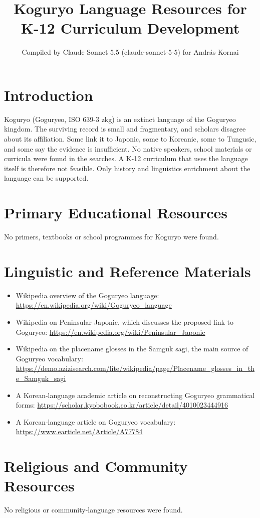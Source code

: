 \documentclass[12pt]{article}
\title{Koguryo Language Resources for K-12 Curriculum Development}
\author{Compiled by Claude Sonnet 5.5 (claude-sonnet-5-5) for Andr\'as Kornai}
\date{}
\begin{document}
\maketitle

\section{Introduction}
Koguryo (Goguryeo, ISO 639-3 zkg) is an extinct language of the Goguryeo kingdom. The surviving record is small and fragmentary, and scholars disagree about its affiliation. Some link it to Japonic, some to Koreanic, some to Tungusic, and some say the evidence is insufficient. No native speakers, school materials or curricula were found in the searches. A K-12 curriculum that uses the language itself is therefore not feasible. Only history and linguistics enrichment about the language can be supported.

\section{Primary Educational Resources}
No primers, textbooks or school programmes for Koguryo were found.

\section{Linguistic and Reference Materials}
\begin{itemize}
\item Wikipedia overview of the Goguryeo language: \url{https://en.wikipedia.org/wiki/Goguryeo_language}
\item Wikipedia on Peninsular Japonic, which discusses the proposed link to Goguryeo: \url{https://en.wikipedia.org/wiki/Peninsular_Japonic}
\item Wikipedia on the placename glosses in the Samguk sagi, the main source of Goguryeo vocabulary: \url{https://demo.azizisearch.com/lite/wikipedia/page/Placename_glosses_in_the_Samguk_sagi}
\item A Korean-language academic article on reconstructing Goguryeo grammatical forms: \url{https://scholar.kyobobook.co.kr/article/detail/4010023444916}
\item A Korean-language article on Goguryeo vocabulary: \url{https://www.earticle.net/Article/A77784}
\end{itemize}

\section{Religious and Community Resources}
No religious or community-language resources were found.
\end{document}
